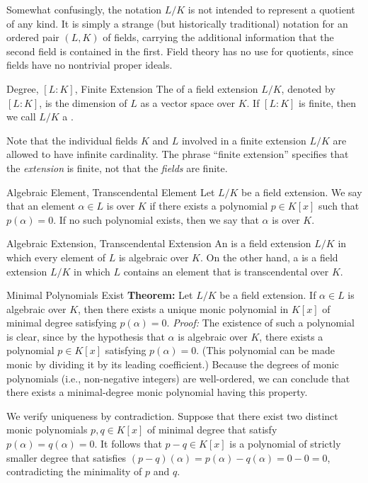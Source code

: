 \documentclass[12pt]{report}
\begin{document}
Somewhat confusingly, the notation $L/K$ is not intended to represent a quotient of any kind. It is simply a strange (but historically traditional) notation for an ordered pair $(L, K)$ of fields, carrying the additional information that the second field is contained in the first. Field theory has no use for quotients, since fields have no nontrivial proper ideals.

\begin{dfnbox}{Degree, $[L : K]$, Finite Extension}
	The  of a field extension $L/K$, denoted by $[L : K]$, is the dimension of $L$ as a vector space over $K$. If $[L : K]$ is finite, then we call $L/K$ a .
\end{dfnbox}

Note that the individual fields $K$ and $L$ involved in a finite extension $L/K$ are allowed to have infinite cardinality. The phrase ``finite extension'' specifies that the \textit{extension} is finite, not that the \textit{fields} are finite.

\begin{dfnbox}{Algebraic Element, Transcendental Element}
	Let $L/K$ be a field extension. We say that an element $\alpha \in L$ is  over $K$ if there exists a polynomial $p \in K[x]$ such that $p(\alpha) = 0$. If no such polynomial exists, then we say that $\alpha$ is  over $K$.
\end{dfnbox}

\begin{dfnbox}{Algebraic Extension, Transcendental Extension}
	An  is a field extension $L/K$ in which every element of $L$ is algebraic over $K$. On the other hand, a  is a field extension $L/K$ in which $L$ contains an element that is transcendental over $K$.
\end{dfnbox}

\begin{thmbox}{Minimal Polynomials Exist}
	\textbf{Theorem:} Let $L/K$ be a field extension. If $\alpha \in L$ is algebraic over $K$, then there exists a unique monic polynomial in $K[x]$ of minimal degree satisfying $p(\alpha) = 0$.
\tcblower
	\textit{Proof:} The existence of such a polynomial is clear, since by the hypothesis that $\alpha$ is algebraic over $K$, there exists a polynomial $p \in K[x]$ satisfying $p(\alpha) = 0$. (This polynomial can be made monic by dividing it by its leading coefficient.) Because the degrees of monic polynomials (i.e., non-negative integers) are well-ordered, we can conclude that there exists a minimal-degree monic polynomial having this property.

	We verify uniqueness by contradiction. Suppose that there exist two distinct monic polynomials $p, q \in K[x]$ of minimal degree that satisfy $p(\alpha) = q(\alpha) = 0$. It follows that $p-q \in K[x]$ is a polynomial of strictly smaller degree that satisfies $(p-q)(\alpha) = p(\alpha) - q(\alpha) = 0 - 0 = 0$, contradicting the minimality of $p$ and $q$.
\end{thmbox}
\end{document}
